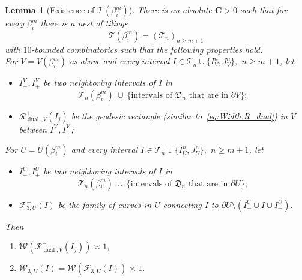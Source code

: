 \documentclass{amsart}
\newcommand{\1}{{\mathbb 1 }}
\newcommand{\Fam}{{\mathcal F}}
\newcommand{\Width}{{\mathcal W}}
\newcommand\TT{\mathcal{T}}
\newcommand{\bC}{{\mathbf{C}}}
\newcommand\RR{\mathcal{R}}
\newcommand\dual{{\operatorname{dual}}}
\newcommand{\Dbb}{{\mathfrak{D}}}
\newtheorem{lem}[thm]{Lemma}
\theoremstyle{remark}
\numberwithin{equation}{section}
\theoremstyle{definition}
\begin{document}
\begin{lem}[Existence of $\TT(\beta^m_i)$]
\label{lem:TT for beta^m_i}
There is an absolute $\bC>0$ such that for every $\beta^m_i$ there is a nest of tilings
 \begin{equation}\label{eq:lem:TT for beta^m_i}
\TT(\beta^m_i)=(\TT_{n})_{n\ge m+1}
\end{equation} with $10$-bounded combinatorics such that the following properties hold. \\
\noindent For $V=V(\beta^m_i)$ as above and every interval $I\in \TT_{n}\cup\{I^n_V,J^n_V\},$ $n\ge m+1$, let 
\begin{itemize}
\item $I^V_-, I_+^V$ be two neighboring intervals of $I$ in \[\TT_{n}(\beta^m_i)\ \cup \ \{\text{intervals of $\Dbb_n$ that are in $\partial V$} \};\]
\item $\RR^+_{\dual,V}(I_j)$ be the geodesic rectangle (similar to~\eqref{eq:Width:R_dual}) in $V$ between $I^V_-, I_+^V$;
\end{itemize}
\noindent For $U=U(\beta^m_i)$ and every interval $I\in \TT_{n}\cup\{I^n_U,J^n_U\},$ $n\ge m+1$, let 
\begin{itemize}
\item $I^U_-, I_+^U$ be two neighboring intervals of $I$ in \[\TT_{n}(\beta^m_i)\ \cup \ \{\text{intervals of $\Dbb_n$ that are in $\partial U$} \};\]
\item  $\Fam_{3,U}^-(I)$ be the family of curves in $U$ connecting $I$ to $\partial U\setminus (I^U_-\cup I\cup  I_+^U)$.
\end{itemize}

 \noindent Then
 \begin{enumerate}[label=\text{(\Alph*)},font=\normalfont,leftmargin=*]
\item \label{A:lem:TT for beta^m_i}$\Width(\RR^+_{\dual,V}(I_j))\asymp 1$;
\item\label{B:lem:TT for beta^m_i} $\Width_{3,U}^-(I)=\Width(\Fam_{3,U}^-(I))\asymp 1$.
\end{enumerate}
\end{lem}
\end{document}
